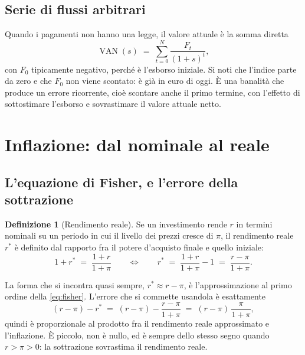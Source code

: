\documentclass[11pt,a4paper]{article}
\theoremstyle{definition}
\newtheorem{definizione}{Definizione}[section]
\theoremstyle{plain}
\DeclareMathOperator{\VAN}{VAN}
\begin{document}
\subsection{Serie di flussi arbitrari}

Quando i pagamenti non hanno una legge, il valore attuale è la somma diretta
\begin{equation}
\VAN(s) \;=\; \sum_{t=0}^{N} \frac{F_t}{(1+s)^t},
\label{eq:van}
\end{equation}
con $F_0$ tipicamente negativo, perché è l'esborso iniziale. Si noti che l'indice parte da zero e che $F_0$ non viene scontato: è già in euro di oggi. È una banalità che produce un errore ricorrente, cioè scontare anche il primo termine, con l'effetto di sottostimare l'esborso e sovrastimare il valore attuale netto.

\section{Inflazione: dal nominale al reale}

\subsection{L'equazione di Fisher, e l'errore della sottrazione}

\begin{definizione}[Rendimento reale]
Se un investimento rende $r$ in termini nominali su un periodo in cui il livello dei prezzi cresce di $\pi$, il rendimento reale $r^*$ è definito dal rapporto fra il potere d'acquisto finale e quello iniziale:
\begin{equation}
1 + r^* \;=\; \frac{1+r}{1+\pi}
\qquad\Longleftrightarrow\qquad
r^* \;=\; \frac{1+r}{1+\pi} - 1 \;=\; \frac{r-\pi}{1+\pi}.
\label{eq:fisher}
\end{equation}
\end{definizione}

La forma che si incontra quasi sempre, $r^* \approx r - \pi$, è l'approssimazione al primo ordine della \eqref{eq:fisher}. L'errore che si commette usandola è esattamente
\begin{equation}
(r-\pi) - r^* \;=\; (r-\pi) - \frac{r-\pi}{1+\pi} \;=\; (r-\pi)\,\frac{\pi}{1+\pi},
\label{eq:errore-fisher}
\end{equation}
quindi è proporzionale al prodotto fra il rendimento reale approssimato e l'inflazione. È piccolo, non è nullo, ed è sempre dello stesso segno quando $r>\pi>0$: la sottrazione sovrastima il rendimento reale.
\end{document}
